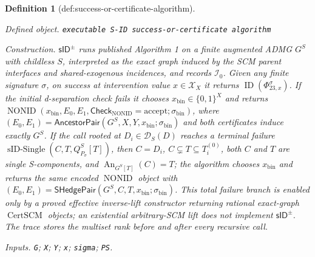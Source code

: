 \documentclass{article}
\newtheorem{definition}{Definition}
\begin{document}
\begin{definition}[def:success-or-certificate-algorithm]\label{def:success-or-certificate-algorithm}
\par\smallskip\noindent\emph{Defined object.} \texttt{executable S-\allowbreak{}ID success-\allowbreak{}or-\allowbreak{}certificate algorithm}
\par\smallskip\noindent\emph{Construction.} \(\mathsf{sID}^{\pm}\) runs published Algorithm 1 on a finite augmented ADMG \(G^S\) with childless \(S\), interpreted as the exact graph induced by the SCM parent interfaces and shared-exogenous incidences, and records \(\mathcal I_0\). Given any finite signature \(\sigma\), on success at intervention value \(x\in\mathcal X_X\) it returns \(\operatorname{ID}(\Phi_{23,x}^{\sigma})\). If the initial d-separation check fails it chooses \(x_{\mathrm{bin}}\in\{0,1\}^{X}\) and returns \(\operatorname{NONID}(x_{\mathrm{bin}},E_0,E_1,\mathsf{Check}_{\mathrm{NONID}}=\mathrm{accept};\sigma_{\mathrm{bin}})\), where \((E_0,E_1)=\mathsf{AncestorPair}(G^S,X,Y,x_{\mathrm{bin}};\sigma_{\mathrm{bin}})\) and both certificates induce exactly \(G^S\). If the call rooted at \(D_i\in\mathcal D_S(D)\) reaches a terminal failure \(\operatorname{sID\text{-}Single}(C,T,Q_{P_\sigma}^S[T])\), then \(C=D_i\), \(C\subsetneq T\subseteq T_i^{(0)}\), both \(C\) and \(T\) are single S-components, and \(\operatorname{An}_{G^S[T]}(C)=T\); the algorithm chooses \(x_{\mathrm{bin}}\) and returns the same encoded \(\operatorname{NONID}\) object with \((E_0,E_1)=\mathsf{SHedgePair}(G^S,C,T,x_{\mathrm{bin}};\sigma_{\mathrm{bin}})\). This total failure branch is enabled only by a proved effective inverse-lift constructor returning rational exact-graph \(\operatorname{CertSCM}\) objects; an existential arbitrary-SCM lift does not implement \(\mathsf{sID}^{\pm}\). The trace stores the multiset rank before and after every recursive call.
\par\smallskip\noindent\emph{Inputs.} \texttt{G}; \texttt{X}; \texttt{Y}; \texttt{x}; \texttt{sigma}; \texttt{PS}.
\end{definition}
\end{document}
